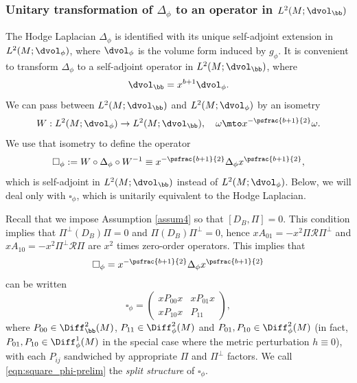 \subsubsection{Unitary transformation of $\Delta_\phi$ to an operator in $L^2(M; \dvol_\bb)$}

The Hodge Laplacian $\Delta_{\phi}$ is identified with its unique self-adjoint extension in
$L^2(M; \dvol_\phi)$, where $\dvol_\phi$ is the volume form induced by $g_\phi$.
It is convenient to transform $\Delta_{\phi}$
to a self-adjoint operator in $L^2(M; \dvol_\bb)$,
where
\begin{equation}\label{dvb}
\dvol_\bb = x^{b+1} \dvol_\phi.
\end{equation}
We can pass between $L^2(M; \dvol_\bb)$ and $L^2(M; \dvol_\phi)$ by an isometry
\begin{equation}\label{T}
W: L^2(M; \dvol_\phi) \to L^2(M; \dvol_\bb), \quad \omega \mto x^{-\psfrac{b+1}{2}} \omega.
\end{equation}
We use that isometry to define the operator
\begin{equation*}
\square_\phi := W \circ \Delta_{\phi} \circ W^{-1} \equiv x^{-\psfrac{b+1}{2}} \Delta_{\phi} x^{\psfrac{b+1}{2}},
\end{equation*}
which is self-adjoint in $L^2(M; \dvol_\bb)$ instead of $L^2(M; \dvol_\phi)$.
Below, we will deal only with $\square_\phi$, which is unitarily equivalent to the
Hodge Laplacian.

Recall that we impose Assumption \ref{assum4} so that $[D_B, \Pi] = 0$.
This condition implies that $\Pi^{\bot}\left(D_{B}\right)\Pi = 0$ and $\Pi\left(D_{B}\right)\Pi^{\bot} = 0$, hence $xA_{01}=-x^2 \Pi
\mathscr{R}\Pi^\perp$ and $xA_{10}=-x^2\Pi^\perp\mathscr{R}\Pi$ are $x^2$ times zero-order operators.
This implies that
\[
\square_{\phi} = x^{-\psfrac{b+1}{2}} \Delta_{\phi}x^{\psfrac{b+1}{2}}
\]
can be written
\begin{equation}
\label{eqn:square_phi-prelim}
\square_\phi =
\begin{pmatrix}
xP_{00}x & xP_{01}x \\
xP_{10}x & P_{11}
\end{pmatrix},
\end{equation}
where $P_{00}\in\Diff^2_\bb(M)$, $P_{11}\in \Diff^2_\phi(M)$
and $P_{01}, P_{10}\in \Diff^2_\phi(M)$ (in fact, $P_{01}, P_{10}\in \Diff^1_\phi(M)$ in the special case where the metric perturbation
$h\equiv 0$),
with each $P_{ij}$ sandwiched by appropriate $\Pi$ and $\Pi^\perp$ factors.
We call \eqref{eqn:square_phi-prelim} the \textit{split structure} of $\square_\phi$.

